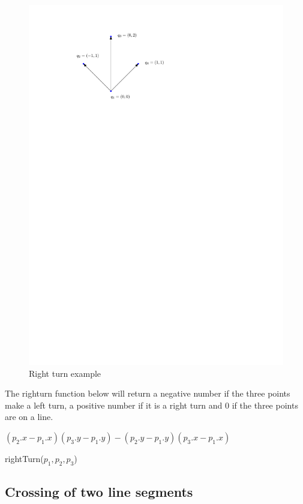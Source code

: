 \begin{figure}[H]
    \centering
	\includegraphics{figures/rightturn3.pdf}
	\caption{Right turn example}
    \label{rightturn3}
\end{figure}

The righturn function below will return a negative number if the three points make a left
turn, a positive number if it is a right turn and 0 if the three points are on
a line.
\begin{algorithm}[H]
	\begin{algorithmic}[1] 
		\State \Return $(p_2.x-p_1.x)(p_3.y-p_1.y)-(p_2.y-p_1.y)(p_3.x-p_1.x)$
	\end{algorithmic}
	\caption{rightTurn($p_1,p_2,p_3$)}
\end{algorithm}

\subsection{Crossing of two line segments}

